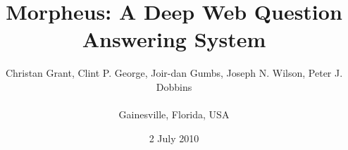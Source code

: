 \documentclass{sig-alternate}
\begin{document}
%

\title{{\ttlit Morpheus}: A Deep Web Question Answering System}

%
%
%
%
%

\author{
	 \alignauthor Christan Grant, Clint P. George, Joir-dan Gumbs, Joseph N. Wilson, Peter J. Dobbins \\
	  \\ \affaddr
{ Gainesville, Florida, USA} \\
}

\date{2 July 2010}


\maketitle


\end{document}
